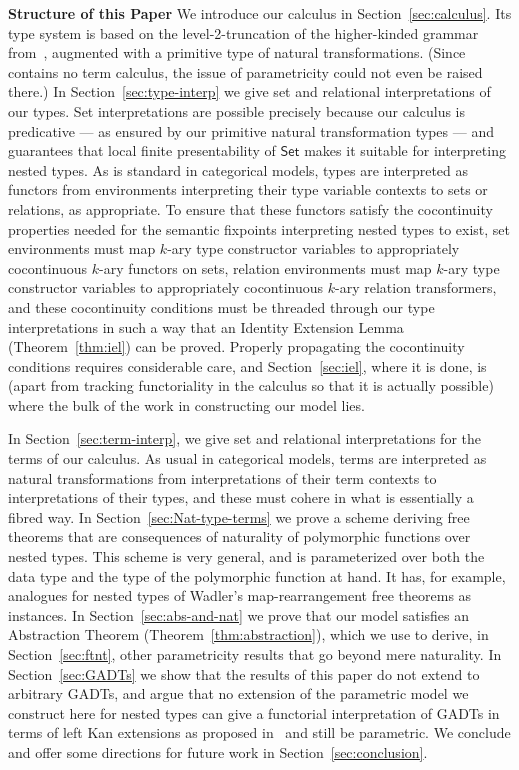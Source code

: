\documentclass{lmcs}
\theoremstyle{plain}\newtheorem{satz}[thm]{Satz}
\newcommand{\set}{\mathsf{Set}}
\begin{document}
{\noindent
{\bf Structure of this Paper}\/ We introduce our calculus in
Section~\ref{sec:calculus}.  Its type system is based on the
level-2-truncation of the higher-kinded grammar from~\cite{jp19},
augmented with a primitive type of natural
transformations. (Since~\cite{jp19} contains no term calculus, the
issue of parametricity could not even be raised there.)  In
Section~\ref{sec:type-interp} we give set and relational
interpretations of our types. Set interpretations are possible
precisely because our calculus is predicative --- as ensured by our
primitive natural transformation types --- and~\cite{jp19} guarantees
that local finite presentability of $\set$ makes it suitable for
interpreting nested types.  As is standard in categorical models,
types are interpreted as functors from environments interpreting their
type variable contexts to sets or relations, as appropriate. To ensure
that these functors satisfy the cocontinuity properties needed for the
semantic fixpoints interpreting nested types to exist, set environments
must map $k$-ary type constructor variables to appropriately
cocontinuous $k$-ary functors on sets, relation environments must map
$k$-ary type constructor variables to appropriately cocontinuous
$k$-ary relation transformers, and these cocontinuity conditions must
be threaded through our type interpretations in such a way that an
Identity Extension Lemma (Theorem~\ref{thm:iel}) can be
proved. Properly propagating the cocontinuity conditions requires
considerable care, and Section~\ref{sec:iel}, where it is done, is
(apart from tracking functoriality in the calculus so that it is
actually possible) where the bulk of the work in constructing our
model lies.

In Section~\ref{sec:term-interp}, we give set and relational
interpretations for the terms of our calculus. As usual in categorical
models, terms are interpreted as natural transformations from
interpretations of their term contexts to interpretations of their
types, and these must cohere in what is essentially a fibred way.  In
Section~\ref{sec:Nat-type-terms} we prove a scheme deriving free
theorems that are consequences of naturality of polymorphic functions
over nested types. This scheme is very general, and is parameterized
over both the data type and the type of the polymorphic function at
hand. It has, for example, analogues for nested types of Wadler's
map-rearrangement free theorems as instances. In
Section~\ref{sec:abs-and-nat} we prove that our model satisfies an
Abstraction Theorem (Theorem~\ref{thm:abstraction}), which we use to
derive, in Section~\ref{sec:ftnt}, other parametricity results that go
beyond mere naturality. In Section~\ref{sec:GADTs} we show that the
results of this paper do not extend to arbitrary GADTs, and argue that
no extension of the parametric model we construct here for nested
types can give a functorial interpretation of GADTs in terms of left
Kan extensions as proposed in~\cite{jp19} and still be parametric. We
conclude and offer some directions for future work in
Section~\ref{sec:conclusion}.

}
\end{document}
